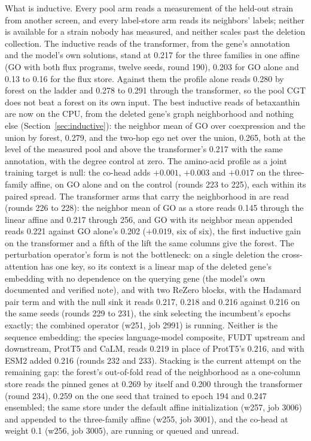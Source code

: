 What is inductive. Every pool arm reads a measurement of the held-out strain from
another screen, and every label-store arm reads its neighbors' labels; neither is
available for a strain nobody has measured, and neither scales past the deletion
collection. The inductive reads of the transformer, from the gene's annotation and the
model's own solutions, stand at 0.217 for the three families in one affine (GO with
both flux programs, twelve seeds, round 190), 0.203 for GO alone and 0.13 to 0.16 for
the flux store. Against them the profile alone reads 0.280 by forest on the ladder and
0.278 to 0.291 through the transformer, so the pool CGT does not beat a forest on its
own input. The best inductive reads of betaxanthin are now on the CPU, from the
deleted gene's graph neighborhood and nothing else (Section~\ref{sec:inductive}): the
neighbor mean of GO over coexpression and the union by forest, 0.279, and the two-hop
ego net over the union, 0.265, both at the level of the measured pool and above the
transformer's 0.217 with the same annotation, with the degree control at zero. The
amino-acid profile as a joint training target is null: the co-head adds $+0.001$,
$+0.003$ and $+0.017$ on the three-family affine, on GO alone and on the control
(rounds 223 to 225), each within its paired spread. The transformer arms that carry
the neighborhood in are read (rounds 226 to 228): the neighbor mean of GO as a store
reads 0.145 through the linear affine and 0.217 through 256, and GO with its neighbor
mean appended reads 0.221 against GO alone's 0.202 ($+0.019$, six of six), the first
inductive gain on the transformer and a fifth of the lift the same columns give the
forest. The perturbation operator's form is not the bottleneck: on a single deletion
the cross-attention has one key, so its context is a linear map of the deleted gene's
embedding with no dependence on the querying gene (the model's own documented and
verified note), and with two ReZero blocks, with the Hadamard pair term and with the
null sink it reads 0.217, 0.218 and 0.216 against 0.216 on the same seeds (rounds 229
to 231), the sink selecting the incumbent's epochs exactly; the combined operator
(w251, job 2991) is running. Neither is the sequence embedding: the species
language-model composite, FUDT upstream and downstream, ProtT5 and CaLM, reads 0.219 in
place of ProtT5's 0.216, and with ESM2 added 0.216 (rounds 232 and 233). Stacking is
the current attempt on the remaining gap: the forest's out-of-fold read of the
neighborhood as a one-column store reads the pinned genes at 0.269 by itself and 0.200
through the transformer (round 234), 0.259 on the one seed that trained to epoch 194
and 0.247 ensembled; the same store under the default affine initialization (w257, job
3006) and appended to the three-family affine (w255, job 3001), and the co-head at
weight 0.1 (w256, job 3005), are running or queued and unread.
